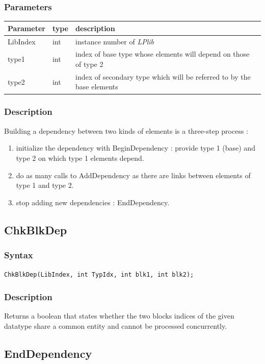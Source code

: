 \documentclass[a4paper,12pt]{article}
\begin{document}
\subsubsection*{Parameters}
\begin{tabular}{|m{2cm}|m{1.5cm}|m{10.5cm}|}
\hline
Parameter  & type   & description \\
\hline
LibIndex   & int    & instance number of \emph{LPlib} \\
\hline
type1      & int    & index of base type whose elements will depend on those of type 2 \\
\hline
type2      & int    & index of secondary type which will be referred to by the base elements \\
\hline
\end{tabular}

\subsubsection*{Description}
Building a dependency between two kinds of elements is a three-step process :

\begin{enumerate}
	\item initialize the dependency with BeginDependency : provide type 1 (base) and type 2 on which type 1 elements depend.
	\item do as many calls to AddDependency as there are links between elements of type 1 and type 2.
	\item stop adding new dependencies : EndDependency.
\end{enumerate}


\subsection{ChkBlkDep}

\subsubsection*{Syntax}
\tt{ChkBlkDep(LibIndex, int TypIdx, int blk1, int blk2);}
\normalfont

\subsubsection*{Description}
Returns a boolean that states whether the two blocks indices of the given datatype share a common entity and cannot be processed concurrently.


\subsection{EndDependency}
\end{document}
